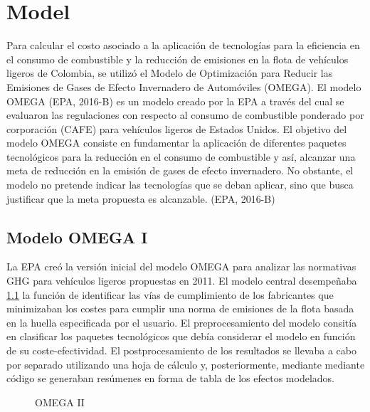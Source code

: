 
\chapter{Model}
\label{sec:results}


Para calcular el costo asociado a la aplicación de tecnologías para la eficiencia en el consumo de combustible y la reducción de emisiones en la flota de vehículos ligeros de Colombia, se utilizó el Modelo de Optimización para Reducir las Emisiones de Gases de Efecto Invernadero de Automóviles (OMEGA).  
El modelo OMEGA (EPA, 2016-B) \cite{EPA_2016-B}  es un modelo creado por la EPA a través del cual se evaluaron las regulaciones con respecto al consumo de combustible ponderado por corporación (CAFE) para vehículos ligeros de Estados Unidos. 
El objetivo del modelo OMEGA consiste en fundamentar la aplicación de diferentes paquetes tecnológicos para la reducción en el consumo de combustible y así, alcanzar una meta de reducción en la emisión de gases de efecto invernadero. No obstante, el modelo no pretende indicar las tecnologías que se deban aplicar, sino que busca justificar que la meta propuesta es alcanzable. (EPA, 2016-B) \cite{EPA_2016-B} 

\section{Modelo OMEGA I}
\label{sec:omega}

La EPA creó la versión inicial del modelo OMEGA para analizar las normativas GHG para vehículos ligeros propuestas en 2011. El modelo central desempeñaba \ref{fig:omega1} la función de identificar las vías de cumplimiento de los fabricantes que minimizaban los costes para cumplir una norma de emisiones de la flota basada en la huella especificada por el usuario. El preprocesamiento del modelo consitía en clasificar los paquetes tecnológicos que debía considerar el modelo en función de su coste-efectividad. El postprocesamiento de los resultados se llevaba a cabo por separado utilizando una hoja de cálculo y, posteriormente, mediante mediante código se generaban resúmenes en forma de tabla de los efectos modelados.

\begin{figure}[htbp]
   \centering
   
    \caption{OMEGA II}
    \label{fig:omega1}
\end{figure}


